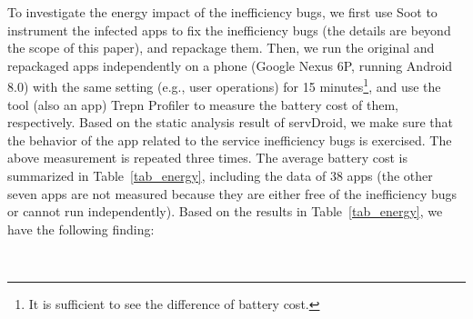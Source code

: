 \documentclass[sigconf,review, anonymous]{acmart}
\begin{document}
To investigate the energy impact of the inefficiency bugs, we first use
\textsf{Soot} to instrument the infected apps to fix the inefficiency bugs (the details are beyond the scope of this paper), and
repackage them. Then, we run the original and repackaged apps independently on a
phone (Google Nexus 6P, running Android 8.0) with the same setting (e.g., user operations) for 15 minutes\footnote{It is sufficient to see the difference of battery cost.}, and use the tool (also an app)
\textsf{Trepn Profiler} to measure the battery cost of them, respectively. Based on the static analysis result of \textsf{servDroid}, we make sure that the behavior of the app related to the service inefficiency bugs is exercised. The above measurement is repeated three times. The
average battery cost is summarized in Table~\ref{tab_energy}, including the data of 38 apps (the other seven
apps are not measured because they are either free of the inefficiency bugs or cannot run
independently).
Based on the results in Table~\ref{tab_energy}, we have the following finding:

\medskip
{\setlength{\parindent}{0 em}
}\\
\medskip
\end{document}

